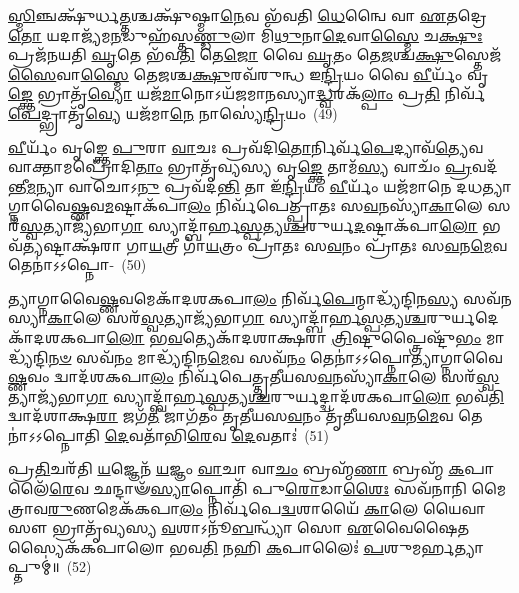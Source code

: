 \-\ul{𑌸𑍍𑌮𑌿}\-𑌞𑍍𑌚𑌕𑍍𑌷𑍁᳴𑌰𑍍𑌧\-\ul{𑌤𑍍𑌤}\-𑌶𑍍𑌚𑌕𑍍𑌷𑍁᳴𑌷𑍍𑌮𑌾\-\ul{𑌨𑍇}\-𑌵 𑌭᳴𑌵𑌤𑌿 \ul{𑌧𑍇}\-𑌨𑍍𑌵𑍈 𑌵𑌾 \ul{𑌏}\-𑌤𑌦𑍍𑌰𑍇\-\ul{𑌤𑍋} 𑌯𑌦𑌾𑌜𑍍𑌯᳴𑌮\-\ul{𑌨}\-𑌡𑍁𑌹᳴𑌸𑍍𑌤\-\ul{𑌣𑍍𑌡𑍁}\-𑌲𑌾 𑌮𑌿᳴\-\ul{𑌥𑍁}\-𑌨𑌾\-\ul{𑌦𑍇}\-𑌵𑌾\-\ul{𑌸𑍍𑌮𑍈} 𑌚\-\ul{𑌕𑍍𑌷𑍁𑌃} 𑌪𑍍𑌰𑌜᳴𑌨𑌯𑌤𑌿 \ul{𑌘𑍃}\-𑌤𑍇 𑌭᳴𑌵\-\ul{𑌤𑌿} 𑌤𑍇\-\ul{𑌜𑍋} 𑌵𑍈 \ul{𑌘𑍃}\-𑌤𑌂 𑌤𑍇\-\ul{𑌜}\-𑌶𑍍𑌚\-\ul{𑌕𑍍𑌷𑍁}\-𑌸𑍍𑌤𑍇𑌜᳴\-\ul{𑌸𑍈}\-𑌵𑌾\-\ul{𑌸𑍍𑌮𑍈} 𑌤𑍇\-\ul{𑌜}\-𑌶𑍍𑌚\-\ul{𑌕𑍍𑌷𑍁}\-𑌰𑌵᳴𑌰𑍁𑌨𑍍𑌧 𑌇\-\ul{𑌨𑍍𑌦𑍍𑌰𑌿}\-𑌯𑌂 𑌵𑍈 \ul{𑌵𑍀}\-𑌰𑍍𑌯𑌂᳴ 𑌵𑍃\-\ul{𑌙𑍍𑌕𑍍𑌤𑍇} 𑌭𑍍𑌰𑌾𑌤𑍃᳴\-\ul{𑌵𑍍𑌯𑍋} 𑌯𑌜᳴\-\ul{𑌮𑌾}\-𑌨𑍋\-𑌽𑌯᳴𑌜𑌮𑌾𑌨𑌸𑍍𑌯𑌾\-\ul{𑌦𑍍𑌧𑍍𑌵}\-𑌰𑌕᳴\-\ul{𑌲𑍍𑌪𑌾𑌂} 𑌪𑍍𑌰\-\ul{𑌤𑌿} 𑌨𑌿𑌰𑍍𑌵᳴\-\ul{𑌪𑍇}\-𑌦𑍍𑌭𑍍𑌰𑌾𑌤𑍃᳴\-\ul{𑌵𑍍𑌯𑍇} 𑌯𑌜᳴𑌮𑌾\-\ul{𑌨𑍇} 𑌨𑌾𑌸𑍍𑌯𑍇॑\-\ul{𑌨𑍍𑌦𑍍𑌰𑌿}\-𑌯𑌂~(49)

\-\ul{𑌵𑍀}\-𑌰𑍍𑌯𑌂᳴ 𑌵𑍃𑌙𑍍𑌕𑍍𑌤𑍇 \ul{𑌪𑍁}\-𑌰𑌾 \ul{𑌵𑌾}\-𑌚𑌃 𑌪𑍍𑌰𑌵᳴𑌦𑌿\-\ul{𑌤𑍋}\-𑌰𑍍𑌨𑌿𑌰𑍍𑌵᳴\-\ul{𑌪𑍇}\-𑌦𑍍𑌯𑌾𑌵᳴\-\ul{𑌤𑍍𑌯𑍇}\-𑌵 𑌵𑌾𑌕𑍍𑌤𑌾𑌮𑌪𑍍𑌰𑍋᳴𑌦𑌿\-\ul{𑌤𑌾𑌂} 𑌭𑍍𑌰𑌾𑌤𑍃᳴𑌵𑍍𑌯𑌸𑍍𑌯 𑌵𑍃\-\ul{𑌙𑍍𑌕𑍍𑌤𑍇} 𑌤𑌾𑌮᳴\-\ul{𑌸𑍍𑌯} 𑌵𑌾𑌚𑌂᳴ \ul{𑌪𑍍𑌰}\-𑌵𑌦᳴𑌨𑍍𑌤𑍀\-\ul{𑌮}\-𑌨𑍍𑌯𑌾 𑌵𑌾𑌚𑍋\-𑌽\-\ul{𑌨𑍁} 𑌪𑍍𑌰𑌵᳴𑌦\-\ul{𑌨𑍍𑌤𑌿} 𑌤𑌾 𑌇᳴\-\ul{𑌨𑍍𑌦𑍍𑌰𑌿}\-𑌯𑌂 \ul{𑌵𑍀}\-𑌰𑍍𑌯𑌂᳴ 𑌯𑌜᳴𑌮𑌾𑌨𑍇 𑌦𑌧𑌤𑍍𑌯𑌾𑌗𑍍𑌨𑌾\-𑌵𑍈\-\ul{𑌷𑍍𑌣}\-𑌵\-\-\ul{𑌮}\-𑌷𑍍𑌟𑌾\-𑌕᳴𑌪𑌾\-\ul{𑌲𑌂} 𑌨𑌿𑌰𑍍𑌵᳴𑌪𑍇𑌤𑍍𑌪𑍍𑌰𑌾𑌤𑌃 𑌸\-\ul{𑌵}\-𑌨𑌸𑍍𑌯𑌾᳴\-\ul{𑌕𑌾}\-𑌲𑍇 𑌸𑌰᳴\-\ul{𑌸𑍍𑌵}\-𑌤𑍍𑌯𑌾𑌜𑍍𑌯᳴𑌭𑌾\-\ul{𑌗𑌾} 𑌸𑍍𑌯𑌾𑌦𑍍𑌬𑌾᳴𑌰𑍍\mbox{}𑌹\-\ul{𑌸𑍍𑌪}\-𑌤𑍍𑌯\-\ul{𑌶𑍍𑌚}\-𑌰𑍁𑌰𑍍𑌯\-\ul{𑌦}\-𑌷𑍍𑌟𑌾𑌕᳴𑌪𑌾\-\ul{𑌲𑍋} 𑌭𑌵᳴\-\ul{𑌤𑍍𑌯}\-𑌷𑍍𑌟𑌾𑌕𑍍𑌷᳴𑌰𑌾 𑌗𑌾\-\ul{𑌯}\-𑌤𑍍𑌰𑍀 𑌗𑌾᳴\-\ul{𑌯}\-𑌤𑍍𑌰𑌂 𑌪𑍍𑌰𑌾᳴𑌤𑌃 𑌸\-\ul{𑌵}\-𑌨𑌂 𑌪𑍍𑌰𑌾᳴𑌤𑌃 𑌸\-\ul{𑌵}\-𑌨\-\ul{𑌮𑍇}\-𑌵 𑌤𑍇𑌨𑌾॑𑌽𑌽𑌪𑍍𑌨𑍋-~(50)

𑌤𑍍𑌯𑌾𑌗𑍍𑌨𑌾𑌵𑍈\-\ul{𑌷𑍍𑌣}\-𑌵𑌮𑍇𑌕𑌾᳴\-𑌦𑌶\-𑌕𑌪𑌾\-\ul{𑌲𑌂} 𑌨𑌿𑌰𑍍𑌵᳴\-\ul{𑌪𑍇}\-𑌨𑍍𑌮𑌾𑌦𑍍𑌧𑍍𑌯᳴𑌨𑍍𑌦𑌿𑌨\-\ul{𑌸𑍍𑌯} 𑌸𑌵᳴𑌨𑌸𑍍𑌯𑌾\-\ul{𑌕𑌾}\-𑌲𑍇 𑌸𑌰᳴\-\ul{𑌸𑍍𑌵}\-𑌤𑍍𑌯𑌾𑌜𑍍𑌯᳴𑌭𑌾\-\ul{𑌗𑌾} 𑌸𑍍𑌯𑌾𑌦𑍍𑌬𑌾᳴𑌰𑍍\mbox{}𑌹\-\ul{𑌸𑍍𑌪}\-𑌤𑍍𑌯\-\ul{𑌶𑍍𑌚}\-𑌰𑍁𑌰𑍍𑌯𑌦𑍇𑌕𑌾᳴\-𑌦𑌶\-𑌕𑌪𑌾\-\ul{𑌲𑍋} 𑌭\-\ul{𑌵}\-𑌤𑍍𑌯𑍇𑌕𑌾᳴\-𑌦𑌶𑌾𑌕𑍍𑌷𑌰𑌾 \ul{𑌤𑍍𑌰𑌿}\-𑌷𑍍𑌟𑍁𑌪𑍍𑌤𑍍𑌰𑍈𑌷𑍍𑌟𑍁᳴\-\ul{𑌭𑌂} 𑌮𑌾𑌦𑍍𑌧𑍍𑌯᳴𑌨𑍍𑌦𑌿\-\ul{𑌨}\-\-\ul{𑍞} 𑌸𑌵᳴\-\ul{𑌨𑌂} 𑌮𑌾𑌦𑍍𑌧𑍍𑌯᳴𑌨𑍍𑌦𑌿𑌨\-\ul{𑌮𑍇}\-𑌵 𑌸𑌵᳴\-\ul{𑌨𑌂} 𑌤𑍇𑌨𑌾॑𑌽𑌽𑌪𑍍𑌨𑍋𑌤𑍍𑌯𑌾𑌗𑍍𑌨𑌾𑌵𑍈\-\ul{𑌷𑍍𑌣}\-𑌵𑌂 𑌦𑍍𑌵𑌾𑌦᳴𑌶\-𑌕𑌪𑌾\-\ul{𑌲𑌂} 𑌨𑌿𑌰𑍍𑌵᳴𑌪𑍇𑌤𑍍𑌤𑍃𑌤𑍀𑌯𑌸\-\ul{𑌵}\-𑌨𑌸𑍍𑌯𑌾᳴\-\ul{𑌕𑌾}\-𑌲𑍇 𑌸𑌰᳴\-\ul{𑌸𑍍𑌵}\-𑌤𑍍𑌯𑌾𑌜𑍍𑌯᳴𑌭𑌾\-\ul{𑌗𑌾} 𑌸𑍍𑌯𑌾𑌦𑍍𑌬𑌾᳴𑌰𑍍\mbox{}𑌹\-\-\ul{𑌸𑍍𑌪}\-𑌤𑍍𑌯\-\ul{𑌶𑍍𑌚}\-𑌰𑍁𑌰𑍍𑌯𑌦𑍍𑌦𑍍𑌵𑌾𑌦᳴𑌶\-𑌕𑌪𑌾\-\ul{𑌲𑍋} 𑌭𑌵᳴\-\ul{𑌤𑌿} 𑌦𑍍𑌵𑌾𑌦᳴𑌶𑌾𑌕𑍍𑌷\-\ul{𑌰𑌾} 𑌜𑌗᳴\-\ul{𑌤𑍀} 𑌜𑌾𑌗᳴𑌤𑌂 𑌤𑍃𑌤𑍀𑌯𑌸\-\ul{𑌵}\-𑌨𑌂 𑌤𑍃᳴𑌤𑍀𑌯𑌸\-\ul{𑌵}\-𑌨\-\ul{𑌮𑍇}\-𑌵 𑌤𑍇𑌨𑌾॑𑌽𑌽𑌪𑍍𑌨𑍋𑌤𑌿 \ul{𑌦𑍇}\-𑌵𑌤𑌾᳴𑌭𑌿\-\ul{𑌰𑍇}\-𑌵 \ul{𑌦𑍇}\-𑌵𑌤𑌾𑌃॑~(51)

𑌪𑍍𑌰\-\ul{𑌤𑌿}\-𑌚𑌰᳴𑌤𑌿 \ul{𑌯}\-𑌜𑍍𑌞𑍇𑌨᳴ \ul{𑌯}\-𑌜𑍍𑌞𑌂 \ul{𑌵𑌾}\-𑌚𑌾 𑌵𑌾\-\ul{𑌚𑌂} 𑌬𑍍𑌰𑌹𑍍𑌮᳴\-\ul{𑌣𑌾} 𑌬𑍍𑌰𑌹𑍍𑌮᳴ \ul{𑌕}\-𑌪𑌾𑌲𑍈᳴\-\ul{𑌰𑍇}\-𑌵 𑌛𑌨𑍍𑌦𑌾𑍟᳴\-\ul{𑌸𑍍𑌯𑌾}\-𑌪𑍍𑌨𑍋𑌤𑌿᳴ 𑌪𑍁\-\ul{𑌰𑍋}\-𑌡𑌾\-\ul{𑌶𑍈𑌃} 𑌸𑌵᳴𑌨𑌾𑌨𑌿 𑌮𑍈𑌤𑍍𑌰𑌾𑌵\-\ul{𑌰𑍁}\-𑌣𑌮𑍇𑌕᳴𑌕𑌪𑌾\-\ul{𑌲𑌂} 𑌨𑌿𑌰𑍍𑌵᳴𑌪𑍇\-\ul{𑌦𑍍𑌵}\-𑌶𑌾𑌯𑍈᳴ \ul{𑌕𑌾}\-𑌲𑍇 𑌯𑍈𑌵𑌾𑌸𑍗 𑌭𑍍𑌰𑌾𑌤𑍃᳴𑌵𑍍𑌯𑌸𑍍𑌯 \ul{𑌵}\-𑌶𑌾\-𑌽𑌨𑍂᳴\-\ul{𑌬}\-𑌨𑍍𑌧𑍍𑌯𑌾᳴ 𑌸𑍋 \ul{𑌏}\-𑌵𑍈𑌷𑍈𑌤𑌸𑍍𑌯𑍈𑌕᳴𑌕𑌪𑌾𑌲𑍋 𑌭𑌵\-\ul{𑌤𑌿} 𑌨𑌹𑌿 \ul{𑌕}\-𑌪𑌾𑌲𑍈𑌃॑ \ul{𑌪}\-𑌶𑍁𑌮𑌰𑍍\mbox{}\-\ul{𑌹}\-𑌤𑍍𑌯𑌾𑌪𑍍𑌤𑍁𑌮𑍍॑॥~(52)

